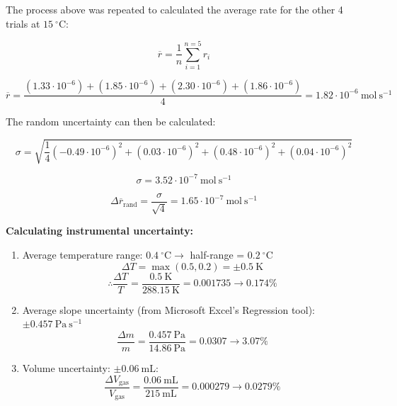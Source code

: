 \documentclass[hyphens]{article}
\begin{document}
\noindent The process above was repeated to calculated the average rate for the other 4 trials at $15\ ^\circ$C:

\begin{equation}
  \overline{r} = \frac{1}{n} \sum_{i=1}^{n=5} r_i
\end{equation}

\begin{equation}
  \overline{r} = \frac{(1.33 \cdot 10^{-6}) + (1.85 \cdot 10^{-6}) + (2.30 \cdot 10^{-6}) + (1.86 \cdot 10^{-6})}{4} = 1.82 \cdot 10^{-6}\ \text{mol}\ \text{s}^{-1}
\end{equation}

\noindent The random uncertainty can then be calculated:

\begin{equation}
  \sigma = \sqrt{\frac{1}{4}(-0.49 \cdot 10^{-6})^2 + (0.03 \cdot 10^{-6})^2 + (0.48 \cdot 10^{-6})^2 + (0.04 \cdot 10^{-6})^2}
\end{equation}

\vspace{-\baselineskip}
\begin{equation*}
  \sigma = 3.52 \cdot 10^{-7}\ \text{mol}\ \text{s}^{-1}
\end{equation*}

\begin{equation}
  \Delta{\overline{r}_\text{rand}} = \frac{\sigma}{\sqrt{4}} = 1.65 \cdot 10^{-7}\ \text{mol}\ \text{s}^{-1}
\end{equation}

\noindent \textbf{Calculating instrumental uncertainty:}

\begin{enumerate}
  \item Average temperature range: $0.4\ ^\circ \text{C} \rightarrow $ half-range = $0.2\ ^\circ$C
  \begin{equation*}
    \Delta{T} = \max{(0.5, 0.2)} = \pm 0.5\ \text{K}
  \end{equation*}
  \begin{equation}
    \therefore \frac{\Delta{T}}{T} = \frac{0.5\ \text{K}}{288.15\ \text{K}} = 0.001735 \rightarrow 0.174\%
  \end{equation}
  \item Average slope uncertainty (from Microsoft Excel's Regression tool): $\pm 0.457\ \text{Pa}\ \text{s}^{-1}$
  \begin{equation}
    \frac{\Delta{m}}{m} = \frac{0.457\ \text{Pa}}{14.86\ \text{Pa}} = 0.0307 \rightarrow 3.07\%
  \end{equation}
  \item Volume uncertainty: $\pm 0.06\ \text{mL}$:
  \begin{equation}
    \frac{\Delta{V_\text{gas}}}{V_\text{gas}} = \frac{0.06\ \text{mL}}{215\ \text{mL}} = 0.000279 \rightarrow 0.0279\%
  \end{equation}
\end{enumerate}
\end{document}
